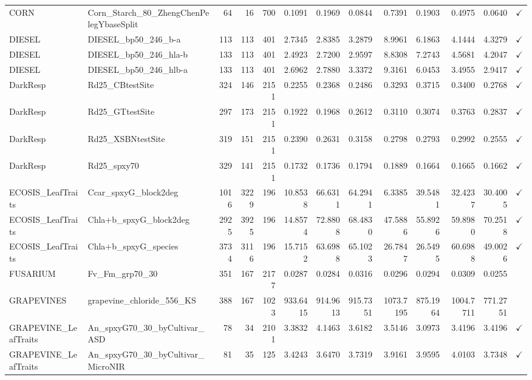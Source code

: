\begin{tabular}{llrrrrrrrrrrc}
CORN & Corn\_Starch\_80\_ZhengChenPelegYbaseSplit & 64 & 16 & 700 & 0.1091 & 0.1969 & 0.0844 & 0.7391 & 0.1903 & 0.4975 & 0.0640 & $\checkmark$ \\
DIESEL & DIESEL\_bp50\_246\_b-a & 113 & 113 & 401 & 2.7345 & 2.8385 & 3.2879 & 8.9961 & 6.1863 & 4.1444 & 4.3279 & $\checkmark$ \\
DIESEL & DIESEL\_bp50\_246\_hla-b & 133 & 113 & 401 & 2.4923 & 2.7200 & 2.9597 & 8.8308 & 7.2743 & 4.5681 & 4.2047 & $\checkmark$ \\
DIESEL & DIESEL\_bp50\_246\_hlb-a & 133 & 113 & 401 & 2.6962 & 2.7880 & 3.3372 & 9.3161 & 6.0453 & 3.4955 & 2.9417 & $\checkmark$ \\
DarkResp & Rd25\_CBtestSite & 324 & 146 & 2151 & 0.2255 & 0.2368 & 0.2486 & 0.3293 & 0.3715 & 0.3400 & 0.2768 & $\checkmark$ \\
DarkResp & Rd25\_GTtestSite & 297 & 173 & 2151 & 0.1922 & 0.1968 & 0.2612 & 0.3110 & 0.3074 & 0.3763 & 0.2837 & $\checkmark$ \\
DarkResp & Rd25\_XSBNtestSite & 319 & 151 & 2151 & 0.2390 & 0.2631 & 0.3158 & 0.2798 & 0.2793 & 0.2992 & 0.2555 & $\checkmark$ \\
DarkResp & Rd25\_spxy70 & 329 & 141 & 2151 & 0.1732 & 0.1736 & 0.1794 & 0.1889 & 0.1664 & 0.1665 & 0.1662 & $\checkmark$ \\
ECOSIS\_LeafTraits & Ccar\_spxyG\_block2deg & 1016 & 3229 & 196 & 10.8538 & 66.6311 & 64.2941 & 6.3385 & 39.5481 & 32.4237 & 30.4005 & $\checkmark$ \\
ECOSIS\_LeafTraits & Chla+b\_spxyG\_block2deg & 2925 & 3925 & 196 & 14.8574 & 72.8808 & 68.4830 & 47.5886 & 55.8926 & 59.8980 & 70.2518 & $\checkmark$ \\
ECOSIS\_LeafTraits & Chla+b\_spxyG\_species & 3734 & 3116 & 196 & 15.7152 & 63.6988 & 65.1023 & 26.7847 & 26.5495 & 60.6988 & 49.0026 & $\checkmark$ \\
FUSARIUM & Fv\_Fm\_grp70\_30 & 351 & 167 & 2177 & 0.0287 & 0.0284 & 0.0316 & 0.0296 & 0.0294 & 0.0309 & 0.0255 &  \\
GRAPEVINES & grapevine\_chloride\_556\_KS & 388 & 167 & 1023 & 933.6415 & 914.9613 & 915.7351 & 1073.7195 & 875.1964 & 1004.7711 & 771.2751 &  \\
GRAPEVINE\_LeafTraits & An\_spxyG70\_30\_byCultivar\_ASD & 78 & 34 & 2101 & 3.3832 & 4.1463 & 3.6182 & 3.5146 & 3.0973 & 3.4196 & 3.4196 & $\checkmark$ \\
GRAPEVINE\_LeafTraits & An\_spxyG70\_30\_byCultivar\_MicroNIR & 81 & 35 & 125 & 3.4243 & 3.6470 & 3.7319 & 3.9161 & 3.9595 & 4.0103 & 3.7348 & $\checkmark$ \\

\end{tabular}
